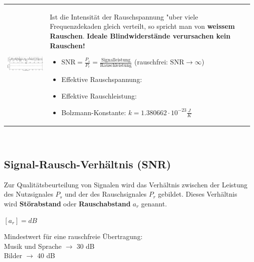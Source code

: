 		\begin{tabularx}{\textwidth}{lX}
			\parbox{8cm}{
				\includegraphics[width=8cm]{./bilder/rauschen2.png}
			} &
			\parbox{9.5cm}{
			Ist die Intensität der
			Rauschspannung "uber viele Frequenzdekaden
			gleich verteilt, so spricht man von \textbf{weissem Rauschen}.\\ \\
			\textbf{Ideale Blindwiderstände verursachen kein Rauschen!}
			\begin{itemize}
     			\item $\text{SNR} = \frac{P_s}{P_r} = \frac{\text{Signalleistung}}{\text{Rauschleistung}}$ (rauschfrei: $ \text{SNR} \rightarrow \infty$) 
     			\item Effektive Rauschspannung: 
     			\item Effektive Rauschleistung: 
     			\item Bolzmann-Konstante: $k =1.380662 \cdot 10^{-23}\frac{J}{K}$
   			\end{itemize}
			}
		\end{tabularx}\\
		
	\subsection{Signal-Rausch-Verhältnis (SNR) }
	
		Zur Qualitätsbeurteilung von Signalen wird das Verhältnis zwischen der Leistung des Nutzsignales $P_s$ und der 
		des Rauschsignales $P_r$ gebildet. Dieses Verhältnis wird \textbf{Störabstand} oder \textbf{Rauschabstand} $a_r$ genannt.\\
	
		\begin{minipage}[]{10cm}
			$[a_r] = dB$\\
		\end{minipage}
		\begin{minipage}[]{10cm}		
			Mindestwert für eine rauschfreie Übertragung: \\
			Musik und Sprache $\rightarrow$ 30 dB \\
			Bilder $\rightarrow$ 40 dB
		\end{minipage}
	
